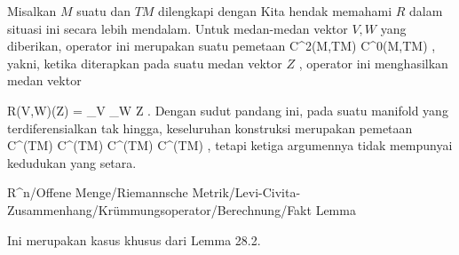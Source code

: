 \setcounter{section}{29}


Misalkan $M$ suatu
dan
$TM$ dilengkapi dengan
Kita hendak memahami
$R$ dalam situasi ini secara lebih mendalam. Untuk medan-medan vektor $V,W$ yang diberikan, operator ini merupakan suatu pemetaan
 { C^2(M,TM) } { C^0(M,TM)
} {,}
yakni, ketika diterapkan pada suatu medan vektor $Z$
 {} {,}
operator ini menghasilkan medan vektor

\mavergleichskettedisp
{\vergleichskette
{ R(V,W)(Z)
}
{ =} { \nabla_V \nabla_W Z
}
{ } {
}
{ } {
}
{ } {
}
}
{}{}{.}
Dengan sudut pandang ini, pada suatu manifold yang terdiferensialkan tak hingga, keseluruhan konstruksi merupakan pemetaan
\maabbdisp {} {C^\infty(TM) \times C^\infty(TM) \times C^\infty(TM)  } { C^\infty(TM)
} {,}
tetapi ketiga argumennya tidak mempunyai kedudukan yang setara.



{R^n/Offene Menge/Riemannsche Metrik/Levi-Civita-Zusammenhang/Krümmungsoperator/Berechnung/Fakt}
{Lemma}
{}
{

\faktzusatz {}
\faktzusatz {}

}
{

Ini merupakan kasus khusus dari
Lemma 28.2.

}



